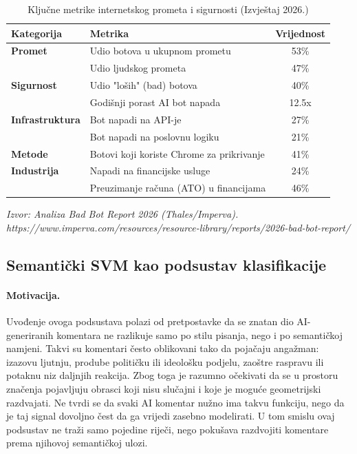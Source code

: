 \documentclass{article}
\begin{document}
\begin{table}[h!]
\centering
\caption{Ključne metrike internetskog prometa i sigurnosti (Izvještaj 2026.)}
\vspace{2mm}
\begin{tabular}{@{}llc@{}}
\toprule
\textbf{Kategorija} & \textbf{Metrika} & \textbf{Vrijednost} \\ \midrule
\textbf{Promet} & Udio botova u ukupnom prometu & 53\% \\
 & Udio ljudskog prometa & 47\% \\
\textbf{Sigurnost} & Udio "loših" (bad) botova & 40\% \\
 & Godišnji porast AI bot napada & 12.5x \\
\textbf{Infrastruktura} & Bot napadi na API-je & 27\% \\
 & Bot napadi na poslovnu logiku & 21\% \\
\textbf{Metode} & Botovi koji koriste Chrome za prikrivanje & 41\% \\
\textbf{Industrija} & Napadi na financijske usluge & 24\% \\
 & Preuzimanje računa (ATO) u financijama & 46\% \\ \bottomrule
\end{tabular}
\begin{flushleft}
\footnotesize \textit{Izvor: Analiza Bad Bot Report 2026 (Thales/Imperva). https://www.imperva.com/resources/resource-library/reports/2026-bad-bot-report/}
\end{flushleft}
\end{table}
\subsection{Semantički SVM kao podsustav klasifikacije}

\paragraph{Motivacija.}
Uvođenje ovoga podsustava polazi od pretpostavke da se znatan dio AI-generiranih komentara ne razlikuje samo po stilu pisanja, nego i po semantičkoj namjeni. Takvi su komentari često oblikovani tako da pojačaju angažman: izazovu ljutnju, prodube političku ili ideološku podjelu, zaoštre raspravu ili potaknu niz daljnjih reakcija. Zbog toga je razumno očekivati da se u prostoru značenja pojavljuju obrasci koji nisu slučajni i koje je moguće geometrijski razdvajati. Ne tvrdi se da svaki AI komentar nužno ima takvu funkciju, nego da je taj signal dovoljno čest da ga vrijedi zasebno modelirati. U tom smislu ovaj podsustav ne traži samo pojedine riječi, nego pokušava razdvojiti komentare prema njihovoj semantičkoj ulozi.
\end{document}
